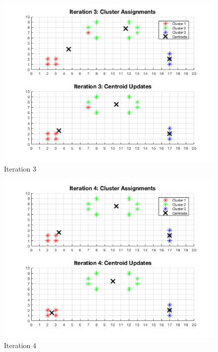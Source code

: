 \documentclass[english]{article}
\begin{document}
\begin{enumerate}
    \begin{figure}[H]
    \centering
    \includegraphics[scale = 0.85]{iter3_b}
    \caption{Iteration 3}
    \end{figure}
    
    \begin{figure}[H]
    \centering
    \includegraphics[scale = 0.85]{iter4_b}
    \caption{Iteration 4}
    \end{figure}
    

\end{enumerate}
\end{document}
